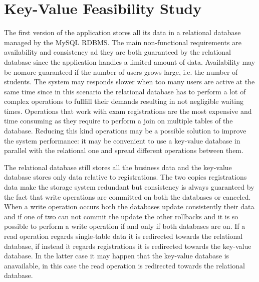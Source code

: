 \documentclass{report}
\begin{document}
\chapter*{Key-Value Feasibility Study}
The first version of the application stores all its data in a relational database managed by the MySQL RDBMS.
The main non-functional requirements are availability and consistency ad they are both guaranteed by the relational database since the application handles a limited amount of data.
Availability may be nomore guaranteed if the number of users grows large, i.e. the number of students. The system may responds slower when too many users are active at the same time since in this scenario the relational database has to perform a lot of complex operations to fullfill their demands resulting in not negligible waiting times. \linebreak
Operations that work with exam registrations are the most expensive and time consuming as they require to perform a join on multiple tables of the database. Reducing this kind operations may be a possible solution to improve the system performance: it may be convenient to use a key-value database in parallel with the relational one and spread different operations between them. \linebreak

The relational database still stores all the business data and the key-value database stores only data relative to registrations. The two copies registrations data make the storage system redundant but consistency is always guaranteed by the fact that write operations are committed on both the databases or canceled.
When a write operation occurs both the databases update consistently their data and if one of two can not commit the update the other rollbacks and it is so possible to perform a write operation if and only if both databases are on.
If a read operation regards single-table data it is redirected towards the relational database, if instead it regards registrations it is redirected towards the key-value database. In the latter case it may happen that the key-value database is anavailable, in this case the read operation is redirected towards the relational database. \linebreak 
\end{document}
